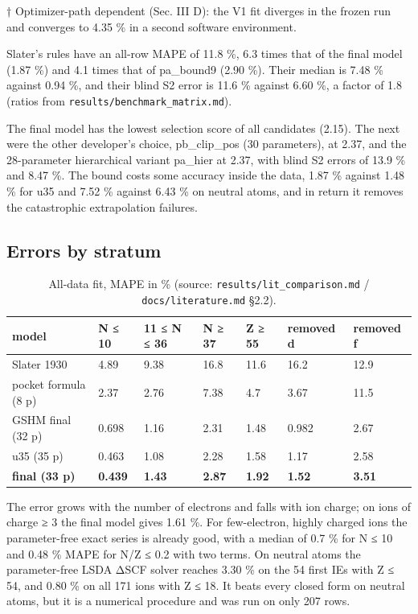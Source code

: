 \documentclass[aps,pra,preprint,superscriptaddress,amsmath,amssymb]{revtex4-2}
\begin{document}
† Optimizer-path dependent (Sec. III D): the V1 fit diverges in the frozen run and converges to 4.35 \% in a second software environment.


Slater's rules have an all-row MAPE of 11.8 \%, 6.3 times that of the final model (1.87 \%) and 4.1 times that of pa\_bound9 (2.90 \%). Their median is 7.48 \% against 0.94 \%, and their blind S2 error is 11.6 \% against 6.60 \%, a factor of 1.8 (ratios from \texttt{results/benchmark\_matrix.md}).


The final model has the lowest selection score of all candidates (2.15). The next were the other developer's choice, pb\_clip\_pos (30 parameters), at 2.37, and the 28-parameter hierarchical variant pa\_hier at 2.37, with blind S2 errors of 13.9 \% and 8.47 \%. The bound costs some accuracy inside the data, 1.87 \% against 1.48 \% for u35 and 7.52 \% against 6.43 \% on neutral atoms, and in return it removes the catastrophic extrapolation failures.


\subsection{Errors by stratum}

\begin{table}[htbp]
\caption{All-data fit, MAPE in \% (source: \texttt{results/lit\_comparison.md} / \texttt{docs/literature.md} §2.2).}
\footnotesize
\begin{ruledtabular}
\begin{tabular}{lllllll}
model & N ≤ 10 & 11 ≤ N ≤ 36 & N ≥ 37 & Z ≥ 55 & removed d & removed f \\
\hline
Slater 1930 & 4.89 & 9.38 & 16.8 & 11.6 & 16.2 & 12.9 \\
pocket formula (8 p) & 2.37 & 2.76 & 7.38 & 4.7 & 3.67 & 11.5 \\
GSHM final (32 p) & 0.698 & 1.16 & 2.31 & 1.48 & 0.982 & 2.67 \\
u35 (35 p) & 0.463 & 1.08 & 2.28 & 1.58 & 1.17 & 2.58 \\
\textbf{final (33 p)} & \textbf{0.439} & \textbf{1.43} & \textbf{2.87} & \textbf{1.92} & \textbf{1.52} & \textbf{3.51} \\
\end{tabular}
\end{ruledtabular}
\end{table}


The error grows with the number of electrons and falls with ion charge; on ions of charge ≥ 3 the final model gives 1.61 \%. For few-electron, highly charged ions the parameter-free exact series is already good, with a median of 0.7 \% for N ≤ 10 and 0.48 \% MAPE for N/Z ≤ 0.2 with two terms. On neutral atoms the parameter-free LSDA ΔSCF solver reaches 3.30 \% on the 54 first IEs with Z ≤ 54, and 0.80 \% on all 171 ions with Z ≤ 18. It beats every closed form on neutral atoms, but it is a numerical procedure and was run on only 207 rows.
\end{document}

